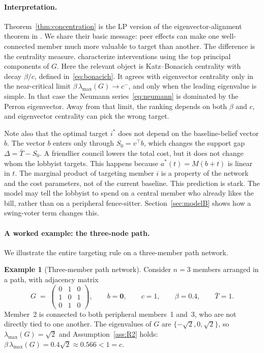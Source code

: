 \documentclass[11pt,letterpaper]{article}
\theoremstyle{plain}
\theoremstyle{definition}
\newtheorem{example}{Example}
\theoremstyle{remark}
\begin{document}
\paragraph{Interpretation.} Theorem~\ref{thm:concentration} is the LP version of the eigenvector-alignment theorem in \citet{ggg2020}. We share their basic message: peer effects can make one well-connected member much more valuable to target than another. The difference is the centrality measure. \citet{ggg2020} characterize interventions using the top principal components of $G$. Here the relevant object is Katz--Bonacich centrality with decay $\beta/c$, defined in~\eqref{eq:bonacich}. It agrees with eigenvector centrality only in the near-critical limit $\beta\,\lambda_{\max}(G) \to c^-$, and only when the leading eigenvalue is simple. In that case the Neumann series~\eqref{eq:neumann} is dominated by the Perron eigenvector. Away from that limit, the ranking depends on both $\beta$ and $c$, and eigenvector centrality can pick the wrong target.

Note also that the optimal target $i^*$ does not depend on the baseline-belief vector $b$. The vector $b$ enters only through $S_0 = v^\top b$, which changes the support gap $\Delta = \bar T - S_0$. A friendlier council lowers the total cost, but it does not change whom the lobbyist targets. This happens because $a^*(t) = M(b+t)$ is linear in $t$. The marginal product of targeting member $i$ is a property of the network and the cost parameters, not of the current baseline. This prediction is stark. The model may tell the lobbyist to spend on a central member who already likes the bill, rather than on a peripheral fence-sitter. Section~\ref{sec:modelB} shows how a swing-voter term changes this.

\paragraph{A worked example: the three-node path.} We illustrate the entire targeting rule on a three-member path network.

\begin{example}[Three-member path network]\label{ex:3path}
Consider $n = 3$ members arranged in a path, with adjacency matrix
\[
G \;=\; \begin{pmatrix} 0 & 1 & 0 \\ 1 & 0 & 1 \\ 0 & 1 & 0 \end{pmatrix}, \qquad b = \mathbf{0}, \qquad c = 1, \qquad \beta = 0.4, \qquad \bar T = 1.
\]
Member~2 is connected to both peripheral members~1 and~3, who are not directly tied to one another. The eigenvalues of $G$ are $\{-\sqrt{2}, 0, \sqrt{2}\}$, so $\lambda_{\max}(G) = \sqrt{2}$ and Assumption~\ref{ass:R2} holds: $\beta\,\lambda_{\max}(G) = 0.4\sqrt{2} \approx 0.566 < 1 = c$. \end{example}
\end{document}
